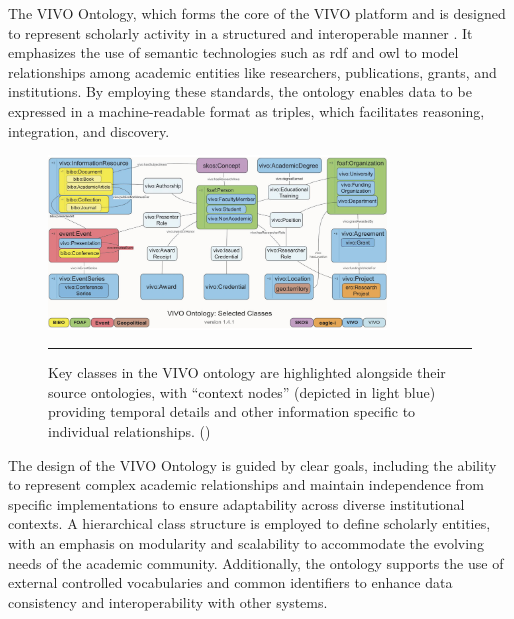 The VIVO Ontology, which forms the core of the VIVO platform and is designed to represent scholarly activity in a structured and interoperable manner \cite{VIVO}.
It emphasizes the use of semantic technologies such as \gls{rdf} and \gls{owl} to model relationships among academic entities like researchers, publications, grants, and institutions.
By employing these standards, the ontology enables data to be expressed in a machine-readable format as triples, which facilitates reasoning, integration, and discovery.

\begin{figure}[htbp]
    \centering
 \includegraphics[width=0.8\textwidth]{figures/literature-review/vivo-ontology.png}
     \rule{35em}{0.5pt}
    \caption{Key classes in the VIVO ontology are highlighted alongside their source ontologies, with ``context nodes'' (depicted in light blue) providing temporal details and other information specific to individual relationships. (\textcite{VIVO})}
 \label{fig:vivo-ontology}
\end{figure}

The design of the VIVO Ontology is guided by clear goals, including the ability to represent complex academic relationships and maintain independence from specific implementations to ensure adaptability across diverse institutional contexts.
A hierarchical class structure is employed to define scholarly entities, with an emphasis on modularity and scalability to accommodate the evolving needs of the academic community.
Additionally, the ontology supports the use of external controlled vocabularies and common identifiers to enhance data consistency and interoperability with other systems.

